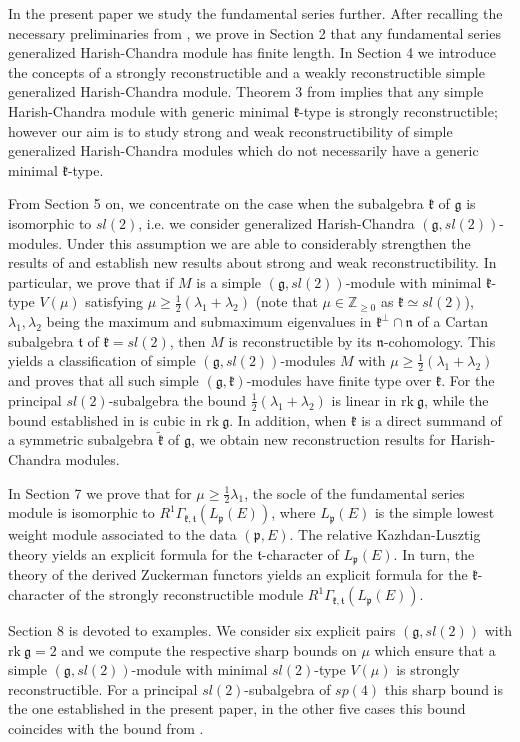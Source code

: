 \documentclass[11pt]{amsart}
\renewcommand{\tt}{\mathfrak{t}}
\newcommand{\kk}{\mathfrak{k}}
\newcommand{\nn}{\mathfrak{n}}
\newcommand{\pp}{\mathfrak{p}}
\renewcommand{\gg}{\mathfrak{g}}
\newcommand{\rk}{\mathrm{rk~}}
\newcommand{\field}[1]{\mathbb{#1}}
\begin{document}
In the present paper we study the fundamental series further. After recalling the necessary preliminaries from \cite{PZ2}, we prove in Section 2 that any fundamental series generalized Harish-Chandra module has finite length. In Section 4 we introduce the concepts of a strongly reconstructible  and a weakly reconstructible simple generalized Harish-Chandra module. Theorem 3 from \cite{PZ2} implies that any simple Harish-Chandra module with generic minimal $\kk$-type is strongly reconstructible; however our aim is to study strong and weak reconstructibility of simple generalized Harish-Chandra modules which do not necessarily have a generic minimal $\kk$-type.

From Section 5 on, we concentrate on the case when the subalgebra $\kk$ of $\gg$ is isomorphic to $sl(2)$, i.e. we consider generalized Harish-Chandra $(\gg,sl(2))$-modules. Under this assumption we are able to considerably strengthen the results of \cite{PZ2} and establish new results about strong and weak reconstructibility. In particular, we prove that if $M$ is a simple $(\gg,sl(2))$-module with minimal $\kk$-type $V(\mu)$ satisfying $\mu\geq\frac{1}{2}(\lambda_1+\lambda_2)$ (note that $\mu\in\field{Z}_{\geq 0}$ as $\kk\simeq sl(2)$), $\lambda_1, \lambda_2$ being the maximum and submaximum eigenvalues in $\kk^{\perp} \cap \nn$ of a Cartan subalgebra $\tt$ of $\kk=sl(2)$, then $M$ is reconstructible by its $\nn$-cohomology. This yields a classification of simple $(\gg,sl(2))$-modules $M$ with $\mu\geq\frac{1}{2}(\lambda_1+\lambda_2)$ and proves that all such simple $(\gg,\kk)$-modules have finite type over $\kk$. For the principal $sl(2)$-subalgebra the bound $\frac{1}{2}(\lambda_1+\lambda_2)$ is linear 
in $\rk\gg$, while 
the bound established in \cite{PZ2} is cubic in $\rk\gg$. In addition, when $\kk$ is a direct summand of a symmetric subalgebra $\tilde{\kk}$ of $\gg$, we obtain new reconstruction results for Harish-Chandra modules.

In Section 7 we prove that for $\mu\geq\frac{1}{2}\lambda_1$, the socle of the fundamental series module is isomorphic to $R^1\Gamma_{\kk,\tt}(L_\pp(E))$, where $L_\pp(E)$ is the simple lowest weight module associated to the data $(\pp,E)$. The relative Kazhdan-Lusztig theory \cite{CC} yields an explicit formula for the $\tt$-character of $L_\pp(E)$. In turn, the theory of the derived Zuckerman functors yields an explicit formula for the $\kk$-character of the strongly reconstructible module  $R^1\Gamma_{\kk,\tt}(L_\pp(E))$. 

Section 8 is devoted to examples. We consider six explicit pairs $(\gg,sl(2))$ with $\rk\gg=2$ and we compute the respective sharp bounds on $\mu$ which ensure that a simple $(\gg,sl(2))$-module with minimal $sl(2)$-type $V(\mu)$ is strongly reconstructible. For a principal $sl(2)$-subalgebra of $sp(4)$ this sharp bound is the one established in the present paper, in the other five cases this bound coincides with the bound from \cite{PZ2}.
\end{document}
